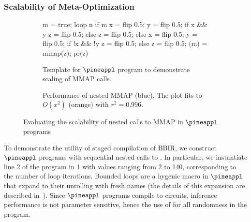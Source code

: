 \subsubsection{Scalability of Meta-Optimization}
\label{subsubsec:meta-optimization-eval}
\begin{figure}[t!]
  \begin{subfigure}{0.45\textwidth}
    \begin{pineapplcodeblock}[basicstyle=\tiny\ttfamily]
m = true;
loop n {
  if m {
    x = flip 0.5; y = flip 0.5;
    if x && y { z = flip 0.5; }
    else { z = flip 0.5; }
  } else {
    x = flip 0.5; y = flip 0.5;
    if !x && !y { z = flip 0.5;}
    else { z = flip 0.5; }
  }
  (m) = mmap(z);
}
pr(z)\end{pineapplcodeblock}
    \caption{Template for $\pineappl$ program to demonstrate scaling of MMAP calls.}
    \label{fig:mmap-scaling-program-pineappl}
  \end{subfigure}\hfill
  \begin{subfigure}{0.45\textwidth}
   \caption{Performance of nested MMAP (blue).
   The plot fits to $O(x^2)$ (orange) with $r^2 = 0.996$.}
   \label{fig:pineappl-nested}
  \end{subfigure}
  \caption{Evaluating the scalability of nested calls to MMAP in $\pineappl$
    programs}
\end{figure}

To demonstrate the utility of staged compilation of BBIR, we construct
$\pineappl$ programs with sequential nested calls to . In
particular, we instantiate line 2 of the program in
\cref{fig:mmap-scaling-program-pineappl} with values ranging from 2 to 140,
corresponding to the number of loop iterations.
Bounded
loops are a hygenic macro in $\pineappl$ that expand to their unrolling with
fresh names (the details of this expansion are described in~\citet{cho2025scaling}).
Since $\pineappl$ programs compile to circuits,
inference performance is not parameter sensitive, hence the use of
 for all randomness in the program.

